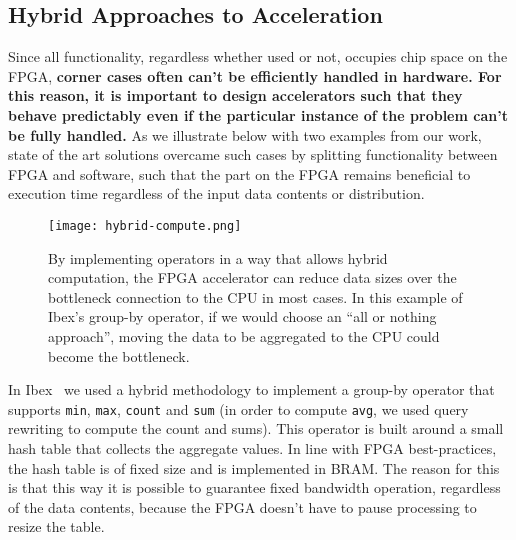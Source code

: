 \documentclass[11pt]{article}
\begin{document}
\subsection{Hybrid Approaches to Acceleration}
\label{sec:hybrid-comp}

Since all functionality, regardless whether used or not, occupies chip space on the FPGA, \textbf{corner cases often can't be efficiently handled in hardware. For this reason, it is important to design accelerators such that they behave predictably even if the particular instance of the problem can't be fully handled.} As we illustrate below with two examples from our work, state of the art solutions overcame such cases by splitting functionality between FPGA and software, such that the part on the FPGA remains beneficial to execution time regardless of the input data contents or distribution. 


\begin{figure}[b]
\centering
\texttt{[image: hybrid-compute.png]}
\caption{By implementing operators in a way that allows hybrid computation, the FPGA accelerator can reduce data sizes over the bottleneck connection to the CPU in most cases. In this example of Ibex's group-by operator, if we would choose an ``all or nothing approach'', moving the data to be aggregated to the CPU could become the bottleneck.\label{fig:hybrid-compute}}
\end{figure}


In Ibex~\cite{woods-Ibex-vldb14} we used a hybrid methodology to implement a group-by operator that supports \texttt{min}, \texttt{max}, \texttt{count} and \texttt{sum} (in order to compute \texttt{avg}, we used query rewriting to compute the count and sums). This operator is built around a small hash table that collects the aggregate values. In line with FPGA best-practices, the hash table is of fixed size and is implemented in BRAM. The reason for this is that this way it is possible to guarantee fixed bandwidth operation, regardless of the data contents, because the FPGA doesn't have to pause processing to resize the table. 
\end{document}
